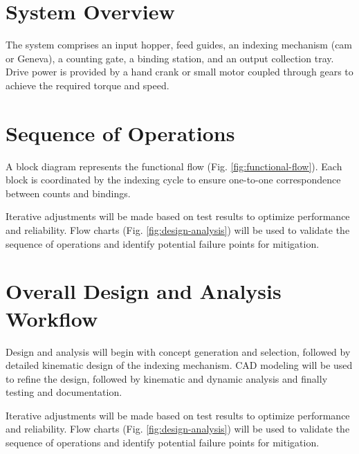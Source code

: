 \section{System Overview}
The system comprises an input hopper, feed guides, an indexing mechanism (cam or Geneva), a counting gate, a binding station, and an output collection tray. Drive power is provided by a hand crank or small motor coupled through gears to achieve the required torque and speed.
\section{Sequence of Operations}
A block diagram represents the functional flow (Fig. \ref{fig:functional-flow}). Each block is coordinated by the indexing cycle to ensure one-to-one correspondence between counts and bindings.
\vspace{1ex}

Iterative adjustments will be made based on test results to optimize performance and reliability. Flow charts (Fig. \ref{fig:design-analysis}) will be used to validate the sequence of operations and identify potential failure points for mitigation.

\section{Overall Design and Analysis Workflow}

Design and analysis will begin with concept generation and selection, followed by detailed kinematic design of the indexing mechanism. CAD modeling will be used to refine the design, followed by kinematic and dynamic analysis and finally testing and documentation. 

Iterative adjustments will be made based on test results to optimize performance and reliability. Flow charts (Fig. \ref{fig:design-analysis}) will be used to validate the sequence of operations and identify potential failure points for mitigation.

